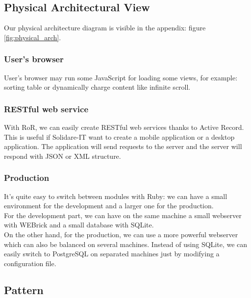 \subsection{Physical Architectural View}
Our physical architecture diagram is visible in the appendix: figure \vref{fig:physical_arch}.

\subsubsection{User's browser}
User's browser may run some JavaScript for loading some views, for example: sorting table or dynamically charge content like infinite scroll.

\subsubsection{RESTful web service}
With RoR, we can easily create RESTful web services thanks to Active Record. This is useful if Solidare-IT want to create a mobile application or a desktop application. The application will send requests to the server and the server will respond with JSON or XML structure.

\subsubsection{Production}
It's quite easy to switch between modules with Ruby: we can have a small environment for the development and a larger one for the production.\\
For the development part, we can have on the same machine a small webserver with WEBrick and a small database with SQLite.\\
On the other hand, for the production, we can use a more powerful webserver which can also be balanced on several machines. Instead of using SQLite, we can easily switch to PostgreSQL on separated machines just by modifying a configuration file.




\subsection{Pattern}

